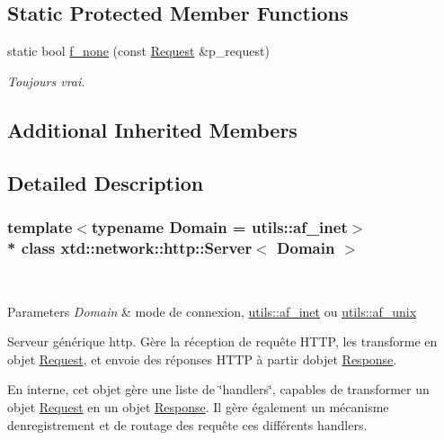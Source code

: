 \subsection*{Static Protected Member Functions}
\begin{DoxyCompactItemize}
\item 
static bool \hyperlink{classxtd_1_1network_1_1http_1_1Server_a862d3098ef04ad7c503ab4e6d04a93cf}{f\+\_\+none} (const \hyperlink{classxtd_1_1network_1_1http_1_1Request}{Request} \&p\+\_\+request)
\begin{DoxyCompactList}\small\item\em Toujours vrai. \end{DoxyCompactList}\end{DoxyCompactItemize}
\subsection*{Additional Inherited Members}


\subsection{Detailed Description}
\subsubsection*{template$<$typename Domain = utils\+::af\+\_\+inet$>$\\*
class xtd\+::network\+::http\+::\+Server$<$ Domain $>$}

~\newline
~\newline
 


\begin{DoxyParams}{Parameters}
{\em Domain} & mode de connexion, \hyperlink{namespacextd_1_1network_1_1utils_a6238bab7a616eda8c9424721444a18d1}{utils\+::af\+\_\+inet} ou \hyperlink{namespacextd_1_1network_1_1utils_a60e83921a2d026f07b49fa094988acdf}{utils\+::af\+\_\+unix}\\
\hline
\end{DoxyParams}
Serveur générique http. Gère la réception de requête H\+T\+TP, les transforme en objet \hyperlink{classxtd_1_1network_1_1http_1_1Request}{Request}, et envoie des réponses H\+T\+TP à partir d\textquotesingle{}objet \hyperlink{classxtd_1_1network_1_1http_1_1Response}{Response}.

En interne, cet objet gère une liste de \char`\"{}handlers\char`\"{}, capables de transformer un objet \hyperlink{classxtd_1_1network_1_1http_1_1Request}{Request} en un objet \hyperlink{classxtd_1_1network_1_1http_1_1Response}{Response}. Il gère également un mécanisme d\textquotesingle{}enregistrement et de routage des requête ces différents handlers.


